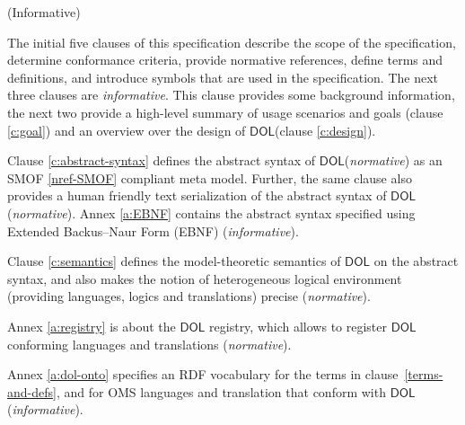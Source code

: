 \documentclass[10pt, a4paper]{isov2}
\newcommand*{\DOL}{\ensuremath{\mathsf{DOL}}\xspace}
\renewcommand{\noterefname}{note}
\renewcommand{\nref}[1]{\noterefname~\ref{#1}}
\newcommand{\informative}[0]{{\begin{center}{\Large{(Informative})}\end{center}} \bigskip}
\renewcommand{\nref}[1]{\ref{nref-#1}}
\newcommand{\clauseI}[1]{\clause{#1} \informative}
\begin{document}
\cleardoublepage
\clauseI{Additional Information}





The initial five clauses of this specification describe the scope of the specification, determine conformance criteria, provide normative references, define terms and definitions, and introduce symbols that are used in the specification. 
The next three clauses are \emph{informative}. This clause provides some background information, the next two provide a high-level
 summary of usage scenarios and goals (clause \ref{c:goal}) and an overview over the design of
\DOL  (clause \ref{c:design}).


\medskip \noindent 
Clause \ref{c:abstract-syntax} defines the abstract syntax of \DOL (\emph{normative}) as an SMOF \nref{SMOF} compliant meta model.
Further,  the same clause also provides a human friendly text serialization of the abstract syntax of 
\DOL (\emph{normative}). 
Annex \ref{a:EBNF} contains the abstract syntax specified using Extended
Backus–Naur Form (EBNF) 
(\emph{informative}).

\medskip \noindent Clause \ref{c:semantics} defines the
model-theoretic semantics of \DOL on the abstract syntax, and also
makes the notion of heterogeneous logical environment (providing
languages, logics and translations) precise (\emph{normative}).

\medskip \noindent Annex \ref{a:registry} is about the \DOL registry,
which allows to register \DOL conforming languages and translations (\emph{normative}).

\medskip \noindent Annex \ref{a:dol-onto} specifies an RDF vocabulary for
the terms in clause~\ref{terms-and-defs}, and for OMS languages and
translation that conform with \DOL  (\emph{informative}).
\end{document}
